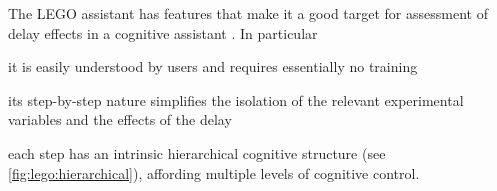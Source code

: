 \documentclass[10pt,letterpaper]{article}
\providecommand{\DIFaddtex}[1]{#1} %
\providecommand{\DIFdeltex}[1]{} %
\providecommand{\DIFaddbegin}{\protect\color{blue}} %
\providecommand{\DIFaddend}{\protect\color{black}} %
\providecommand{\DIFdelbegin}{\protect\color{red}} %
\providecommand{\DIFdelend}{\protect\color{black}} %
\providecommand{\DIFaddbeginFL}{} %
\providecommand{\DIFaddendFL}{} %
\providecommand{\DIFdelbeginFL}{} %
\providecommand{\DIFdelendFL}{} %
\providecommand{\DIFadd}[1]{\texorpdfstring{\DIFaddtex{#1}}{#1}} %
\providecommand{\DIFdel}[1]{\texorpdfstring{\DIFdeltex{#1}}{}} %
\newcommand{\DIFscaledelfig}{0.5}
\newlength{\DIFdelgraphicswidth} %
\newlength{\DIFdelgraphicsheight} %
\newcommand{\DIFaddincludegraphics}[2][]{{\color{blue}\fbox{\DIFOincludegraphics[#1]{#2}}}} %
\newcommand{\DIFdelincludegraphics}[2][]{%
\sbox{\DIFdelgraphicsbox}{\DIFOincludegraphics[#1]{#2}}%
\settoboxwidth{\DIFdelgraphicswidth}{\DIFdelgraphicsbox} %
\settoboxtotalheight{\DIFdelgraphicsheight}{\DIFdelgraphicsbox} %
\scalebox{\DIFscaledelfig}{%
\parbox[b]{\DIFdelgraphicswidth}{\usebox{\DIFdelgraphicsbox}\\[-\baselineskip] \rule{\DIFdelgraphicswidth}{0em}}\llap{\resizebox{\DIFdelgraphicswidth}{\DIFdelgraphicsheight}{%
\setlength{\unitlength}{\DIFdelgraphicswidth}%
\begin{picture}(1,1)%
\thicklines\linethickness{2pt} %
{\color[rgb]{1,0,0}\put(0,0){\framebox(1,1){}}}%
{\color[rgb]{1,0,0}\put(0,0){\line( 1,1){1}}}%
{\color[rgb]{1,0,0}\put(0,1){\line(1,-1){1}}}%
\end{picture}%
}\hspace*{3pt}}} %
} %
\DeclareRobustCommand{\DIFaddbegin}{\DIFOaddbegin \let\includegraphics\DIFaddincludegraphics} %
\DeclareRobustCommand{\DIFaddend}{\DIFOaddend \let\includegraphics\DIFOincludegraphics} %
\DeclareRobustCommand{\DIFdelbegin}{\DIFOdelbegin \let\includegraphics\DIFdelincludegraphics} %
\DeclareRobustCommand{\DIFdelend}{\DIFOaddend \let\includegraphics\DIFOincludegraphics} %
\DeclareRobustCommand{\DIFaddbeginFL}{\DIFOaddbeginFL \let\includegraphics\DIFaddincludegraphics} %
\DeclareRobustCommand{\DIFaddendFL}{\DIFOaddendFL \let\includegraphics\DIFOincludegraphics} %
\DeclareRobustCommand{\DIFdelbeginFL}{\DIFOdelbeginFL \let\includegraphics\DIFdelincludegraphics} %
\DeclareRobustCommand{\DIFdelendFL}{\DIFOaddendFL \let\includegraphics\DIFOincludegraphics} %
\begin{document}
The LEGO assistant has features that make it a good target for assessment of delay effects in a cognitive assistant\DIFdelbegin \DIFdel{:
}%
\DIFdelend \DIFaddbegin \DIFadd{.
In particular
}\begin{enumerate*}[itemjoin={{, }},
                  itemjoin*={{, and }},
                  label={{(\arabic*)}}]
    \item it is easily understood by users and requires essentially no training
    \item its step-by-step nature simplifies the isolation of the relevant experimental variables and the effects of the delay
    \item each step has an intrinsic hierarchical cognitive structure (see \cref{fig:lego:hierarchical}), affording multiple levels of cognitive control. 
\end{enumerate*}
\DIFaddend 

\begin{figure*}[h]
  \centering
  \DIFdelbeginFL %
\DIFdelendFL %
  \caption{Hierarchical cognitive structure of a step in the LEGO task.}
  \label{fig:lego:hierarchical}
\end{figure*}
\end{document}
